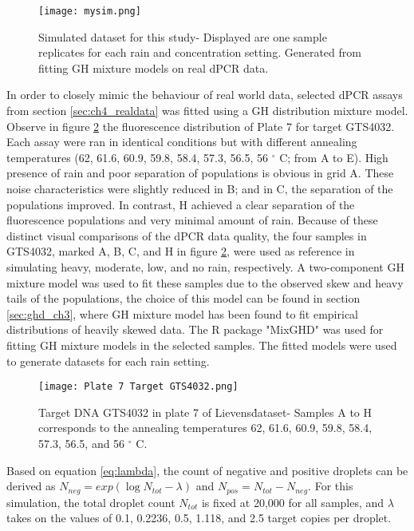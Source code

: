 \begin{figure}[h]
    \centering
    \texttt{[image: mysim.png]}
    \caption[Simulated dataset for this study]{Simulated dataset for this study- Displayed are one sample replicates for each rain and concentration setting. Generated from fitting GH mixture models on real dPCR data.}
        \label{fig:mysim}
\end{figure}

In order to closely mimic the behaviour of real world data, selected dPCR assays from section \ref{sec:ch4_realdata} was fitted using a GH distribution mixture model. Observe in figure \ref{fig:realdata_gts} the fluorescence distribution of Plate 7 for target GTS4032. Each assay were ran in identical conditions but with different annealing temperatures (62, 61.6, 60.9, 59.8, 58.4, 57.3, 56.5, 56 \(^{\circ}\) C; from A to E). High presence of rain and poor separation of populations is obvious in grid A. These noise characteristics were slightly reduced in B; and in C, the separation of the populations improved. In contrast, H achieved a clear separation of the fluorescence populations and very minimal amount of rain. Because of these distinct visual comparisons of the dPCR data quality, the four samples in GTS4032, marked A, B, C, and H in figure \ref{fig:realdata_gts}, were used as reference in simulating heavy, moderate, low, and no rain, respectively. A two-component GH mixture model was used to fit these samples due to the observed skew and heavy tails of the populations, the choice of this model can be found in section \ref{sec:ghd_ch3}, where GH mixture model has been found to fit empirical distributions of heavily skewed data. The R package "MixGHD" \cite{MixGHD} was used for fitting GH mixture models in the selected samples. The fitted models were used to generate datasets for each rain setting.

\begin{figure}[h]
    \centering
    \texttt{[image: Plate 7 Target GTS4032.png]}
    \caption[Target DNA GTS4032 in plate 7 of Lievens\' dataset]%
    {Target DNA GTS4032 in plate 7 of Lievens\' dataset- Samples A to H corresponds to the annealing temperatures 62, 61.6, 60.9, 59.8, 58.4, 57.3, 56.5, and 56 \(^{\circ}\) C.}
        \label{fig:realdata_gts}
\end{figure}

Based on equation \ref{eq:lambda}, the count of negative and positive droplets can be derived as \(N_{neg} = exp(\log{N_{tot}} - \lambda)\) and \(N_{pos} = N_{tot} - N_{neg}\). For this simulation, the total droplet count \(N_{tot}\) is fixed at 20,000 for all samples, and \(\lambda\) takes on the values of 0.1, 0.2236, 0.5, 1.118, and 2.5 target copies per droplet. 

